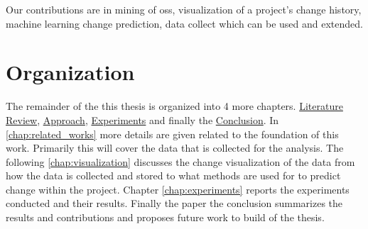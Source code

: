 Our contributions are in mining of \gls{oss}, visualization of a project's change history, machine learning change prediction, data collect which can be used and extended.

\section{Organization}

The remainder of the this thesis is organized into 4 more chapters. \hyperref[chap:related_works]{Literature Review}, \hyperref[chap:approach]{Approach}, \hyperref[chap:experiments]{Experiments} and finally the \hyperref[chap:conclusions]{Conclusion}. In \autoref{chap:related_works} more details are given related to the foundation of this work. Primarily this will cover the data that is collected for the analysis. The following \autoref{chap:visualization} discusses the change visualization of the data from how the data is collected and stored to what methods are used for to predict change within the project. Chapter \ref{chap:experiments} reports the experiments conducted and their results. Finally the paper the conclusion summarizes the results and contributions and proposes future work to build of the thesis.